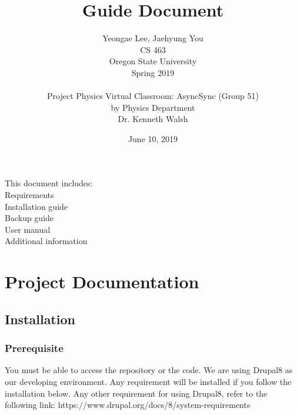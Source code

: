 \documentclass[10pt]{article}
\begin{document}
\begin{titlepage}
    \title{Guide Document}
    \author{Yeongae Lee, Jaehyung You \\ CS 463  \\ Oregon State University \\ Spring 2019 \\ \\ Project Physics Virtual Classroom: AsyncSync (Group 51) \\by Physics Department \\Dr. Kenneth Walsh}
    \date {June 10, 2019}

    \maketitle
        \begin{center}
           This document includes:\\
            Requirements \\
            Installation guide \\
            Backup guide \\
            User manual\\
            Additional information
        \end{center}     
\end{titlepage}

\section{Project Documentation}
    \subsection{Installation}
        \subsubsection{Prerequisite}
            You must be able to access the repository or the code. We are using Drupal8 as our developing environment. Any requirement will be installed if you follow the installation below. Any other requirement for using Drupal8, refer to the following link: https://www.drupal.org/docs/8/system-requirements
        
\end{document}
